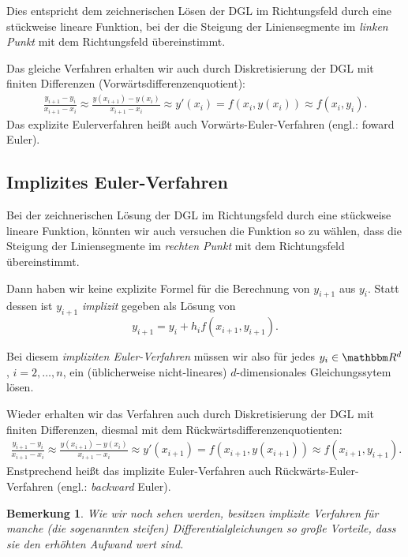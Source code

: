 \documentclass[12pt,a4paper]{book}
\theoremstyle{break}
\newtheorem{bemerkung}[theorem]{Bemerkung}
\theoremstyle{nonumberplain}
\newcommand{\R}{\mathbbm R}
\newcommand{\1}{\mathbbm{1}} 			      	%
\begin{document}
Dies entspricht dem zeichnerischen Lösen der DGL im Richtungsfeld durch eine stückweise lineare Funktion,
bei der die Steigung der Liniensegmente im \emph{linken Punkt} mit dem Richtungsfeld übereinstimmt.

Das gleiche Verfahren erhalten wir auch durch Diskretisierung der DGL mit finiten Differenzen (Vorwärtsdifferenzenquotient):
\begin{align*}
\frac{y_{i+1}-y_i}{x_{i+1}-x_i}
\approx \frac{y(x_{i+1})-y(x_{i})}{x_{i+1}-x_i} \approx y'(x_i)= f(x_i,y(x_i))\approx f(x_i,y_i).
\end{align*}
Das explizite Eulerverfahren heißt auch Vorwärts-Euler-Verfahren (engl.: foward Euler).


\subsection{Implizites Euler-Verfahren}

Bei der zeichnerischen Lösung der DGL im Richtungsfeld durch eine stückweise lineare Funktion,
könnten wir auch versuchen die Funktion so zu wählen, dass die Steigung der Liniensegmente
im \emph{rechten Punkt} mit dem Richtungsfeld übereinstimmt.

Dann haben wir keine explizite Formel für die Berechnung von $y_{i+1}$ aus $y_i$.
Statt dessen ist $y_{i+1}$ \emph{implizit} gegeben als Lösung von 
\[
y_{i+1} = y_i+h_i f(x_{i+1},y_{i+1}).
\]

Bei diesem \emph{impliziten Euler-Verfahren} müssen wir also für jedes $y_i\in \R^d$, $i=2,\ldots,n$,
ein (üblicherweise nicht-lineares) $d$-dimensionales Gleichungssytem lösen.

Wieder erhalten wir das Verfahren auch durch Diskretisierung der DGL mit finiten Differenzen, diesmal mit 
dem Rückwärtsdifferenzenquotienten:
\begin{align*}
\frac{y_{i+1}-y_i}{x_{i+1}-x_i}
\approx \frac{y(x_{i+1})-y(x_{i})}{x_{i+1}-x_i} \approx y'(x_{i+1})= f(x_{i+1},y(x_{i+1}))\approx f(x_{i+1},y_{i+1}).
\end{align*}
Enstprechend heißt das implizite Euler-Verfahren auch Rückwärts-Euler-Ver\-fah\-ren (engl.: \emph{backward} Euler).

\begin{bemerkung}
Wie wir noch sehen werden, besitzen implizite Verfahren für manche (die sogenannten \emph{steifen}) Differentialgleichungen so große Vorteile, dass sie den erhöhten Aufwand wert sind.
\end{bemerkung}
\end{document}
